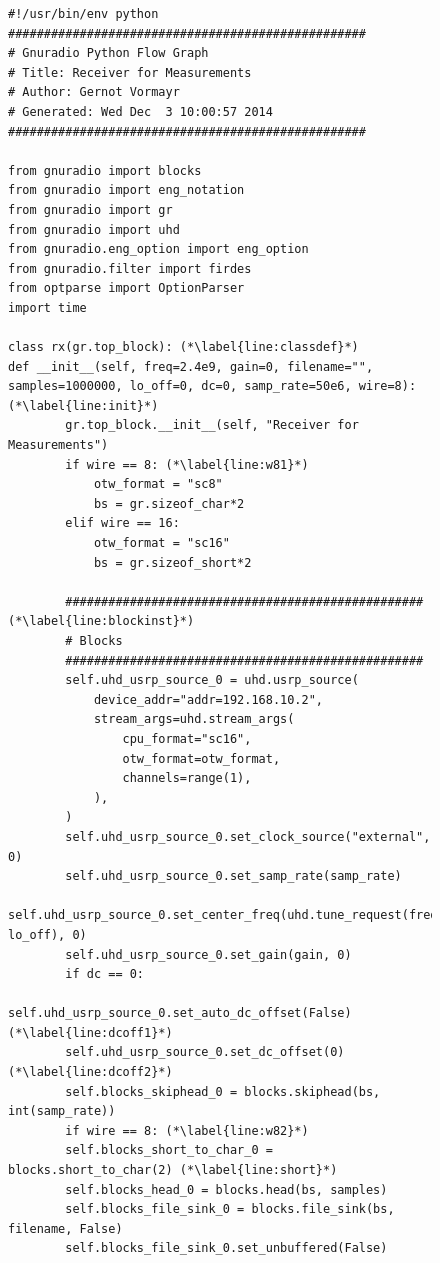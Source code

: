 \documentclass[12pt,a4paper,parskip=full]{scrartcl}
\begin{document}
\begin{figure}[htbp]
    \centering
    \begin{lstlisting}[basicstyle=\tiny,caption={Generated RX flowgraph module with modifications ({\ttfamily rx\_final.py)}},label=lst:rxfinal.py]
#!/usr/bin/env python
##################################################
# Gnuradio Python Flow Graph
# Title: Receiver for Measurements
# Author: Gernot Vormayr
# Generated: Wed Dec  3 10:00:57 2014
##################################################

from gnuradio import blocks
from gnuradio import eng_notation
from gnuradio import gr
from gnuradio import uhd
from gnuradio.eng_option import eng_option
from gnuradio.filter import firdes
from optparse import OptionParser
import time

class rx(gr.top_block): (*\label{line:classdef}*)
def __init__(self, freq=2.4e9, gain=0, filename="", samples=1000000, lo_off=0, dc=0, samp_rate=50e6, wire=8): (*\label{line:init}*)
        gr.top_block.__init__(self, "Receiver for Measurements")
        if wire == 8: (*\label{line:w81}*)
            otw_format = "sc8"
            bs = gr.sizeof_char*2
        elif wire == 16:
            otw_format = "sc16"
            bs = gr.sizeof_short*2

        ################################################## (*\label{line:blockinst}*)
        # Blocks
        ##################################################
        self.uhd_usrp_source_0 = uhd.usrp_source(
        	device_addr="addr=192.168.10.2",
        	stream_args=uhd.stream_args(
        		cpu_format="sc16",
        		otw_format=otw_format,
        		channels=range(1),
        	),
        )
        self.uhd_usrp_source_0.set_clock_source("external", 0)
        self.uhd_usrp_source_0.set_samp_rate(samp_rate)
        self.uhd_usrp_source_0.set_center_freq(uhd.tune_request(freq, lo_off), 0)
        self.uhd_usrp_source_0.set_gain(gain, 0)
        if dc == 0:
            self.uhd_usrp_source_0.set_auto_dc_offset(False) (*\label{line:dcoff1}*)
	    self.uhd_usrp_source_0.set_dc_offset(0)          (*\label{line:dcoff2}*)
        self.blocks_skiphead_0 = blocks.skiphead(bs, int(samp_rate))
        if wire == 8: (*\label{line:w82}*)
        self.blocks_short_to_char_0 = blocks.short_to_char(2) (*\label{line:short}*)
        self.blocks_head_0 = blocks.head(bs, samples)
        self.blocks_file_sink_0 = blocks.file_sink(bs, filename, False)
        self.blocks_file_sink_0.set_unbuffered(False)


\end{lstlisting}
\end{figure}
\end{document}
